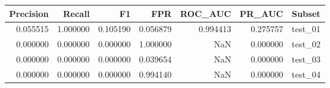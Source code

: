 \begin{tabular}{rrrrrrl}
\toprule
Precision & Recall & F1 & FPR & ROC_AUC & PR_AUC & Subset \\
\midrule
0.055515 & 1.000000 & 0.105190 & 0.056879 & 0.994413 & 0.275757 & test_01 \\
0.000000 & 0.000000 & 0.000000 & 1.000000 & NaN & 0.000000 & test_02 \\
0.000000 & 0.000000 & 0.000000 & 0.039654 & NaN & 0.000000 & test_03 \\
0.000000 & 0.000000 & 0.000000 & 0.994140 & NaN & 0.000000 & test_04 \\
\bottomrule
\end{tabular}
